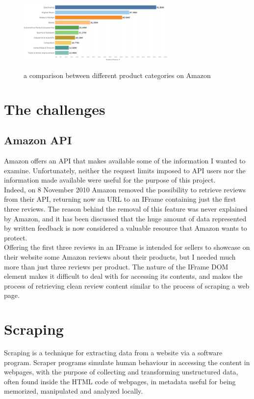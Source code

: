 \documentclass[LaM,oneside,binding=0.6cm]{sapthesis}
\begin{document}
\begin{figure}
\centering
\includegraphics[width=0.7\textwidth]{pictures/prod_types.png}\\[3ex]
\caption{a comparison between different product categories on Amazon}
\label{fig:prod-types}
\end{figure}

\section{The challenges}

\subsection{Amazon API}
Amazon offers an API that makes available some of the information I wanted to examine. Unfortunately, neither the request limits imposed to API users nor the information made available were useful for the purpose of this project. \\
Indeed, on 8 November 2010 Amazon removed the possibility to retrieve reviews from their API, returning now an URL to an IFrame containing just the first three reviews. The reason behind the removal of this feature was never explained by Amazon, and it has been discussed that the huge amount of data represented by written feedback is now considered a valuable resource that Amazon wants to protect. \\
Offering the first three reviews in an IFrame is intended for sellers to showcase on their website some Amazon reviews about their products, but I needed much more than just three reviews per product. The nature of the IFrame DOM element makes it difficult to deal with for accessing its contents, and makes the process of retrieving clean review content similar to the process of scraping a web page. \\


\section{Scraping}

Scraping is a technique for extracting data from a website via a software program. Scraper programs simulate human behaviour in accessing the content in webpages, with the purpose of collecting and transforming unstructured data, often found inside the HTML code of webpages, in metadata useful for being memorized, manipulated and analyzed locally.
\end{document}
